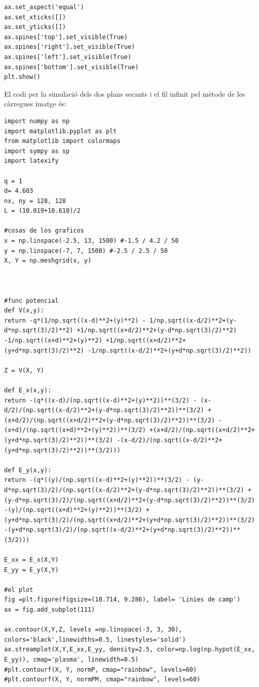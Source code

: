 \documentclass[a4paper,10.5pt]{report}
\begin{document}
\begin{appendices}
\begin{lstlisting}
ax.set_aspect('equal')
ax.set_xticks([])
ax.set_yticks([])
ax.spines['top'].set_visible(True)
ax.spines['right'].set_visible(True)
ax.spines['left'].set_visible(True)
ax.spines['bottom'].set_visible(True)
plt.show()
\end{lstlisting}

El codi per la simulació dels dos plans secants i el fil infinit pel mètode de les càrregues imatge és:
\begin{lstlisting}
import numpy as np
import matplotlib.pyplot as plt
from matplotlib import colormaps
import sympy as sp
import latexify

q = 1
d= 4.603
nx, ny = 128, 128
L = (10.019+10.610)/2

#cosas de los graficos
x = np.linspace(-2.5, 13, 1500) #-1.5 / 4.2 / 50
y = np.linspace(-7, 7, 1500) #-2.5 / 2.5 / 50
X, Y = np.meshgrid(x, y)



#func potencial
def V(x,y):
return -q*(1/np.sqrt((x-d)**2+(y)**2) - 1/np.sqrt((x-d/2)**2+(y-d*np.sqrt(3)/2)**2) +1/np.sqrt((x+d/2)**2+(y-d*np.sqrt(3)/2)**2) -1/np.sqrt((x+d)**2+(y)**2) +1/np.sqrt((x+d/2)**2+(y+d*np.sqrt(3)/2)**2) -1/np.sqrt((x-d/2)**2+(y+d*np.sqrt(3)/2)**2))

Z = V(X, Y)

def E_x(x,y):
return -(q*((x-d)/(np.sqrt((x-d)**2+(y)**2))**(3/2) - (x-d/2)/(np.sqrt((x-d/2)**2+(y-d*np.sqrt(3)/2)**2))**(3/2) +(x+d/2)/(np.sqrt((x+d/2)**2+(y-d*np.sqrt(3)/2)**2))**(3/2) -(x+d)/(np.sqrt((x+d)**2+(y)**2))**(3/2) +(x+d/2)/(np.sqrt((x+d/2)**2+(y+d*np.sqrt(3)/2)**2))**(3/2) -(x-d/2)/(np.sqrt((x-d/2)**2+(y+d*np.sqrt(3)/2)**2))**(3/2)))

def E_y(x,y):
return -(q*((y)/(np.sqrt((x-d)**2+(y)**2))**(3/2) - (y-d*np.sqrt(3)/2)/(np.sqrt((x-d/2)**2+(y-d*np.sqrt(3)/2)**2))**(3/2) +(y-d*np.sqrt(3)/2)/(np.sqrt((x+d/2)**2+(y-d*np.sqrt(3)/2)**2))**(3/2) -(y)/(np.sqrt((x+d)**2+(y)**2))**(3/2) +(y+d*np.sqrt(3)/2)/(np.sqrt((x+d/2)**2+(y+d*np.sqrt(3)/2)**2))**(3/2) -(y+d*np.sqrt(3)/2)/(np.sqrt((x-d/2)**2+(y+d*np.sqrt(3)/2)**2))**(3/2)))

E_xx = E_x(X,Y)
E_yy = E_y(X,Y)

#el plot
fig =plt.figure(figsize=(10.714, 9.286), label= 'Linies de camp') 
ax = fig.add_subplot(111)

ax.contour(X,Y,Z, levels =np.linspace(-3, 3, 30), colors='black',linewidths=0.5, linestyles='solid')
ax.streamplot(X,Y,E_xx,E_yy, density=2.5, color=np.log(np.hypot(E_xx, E_yy)), cmap='plasma', linewidth=0.5)
#plt.contourf(X, Y, normP, cmap="rainbow", levels=60)
#plt.contourf(X, Y, normPM, cmap="rainbow", levels=60)



\end{lstlisting}
\end{appendices}
\end{document}
